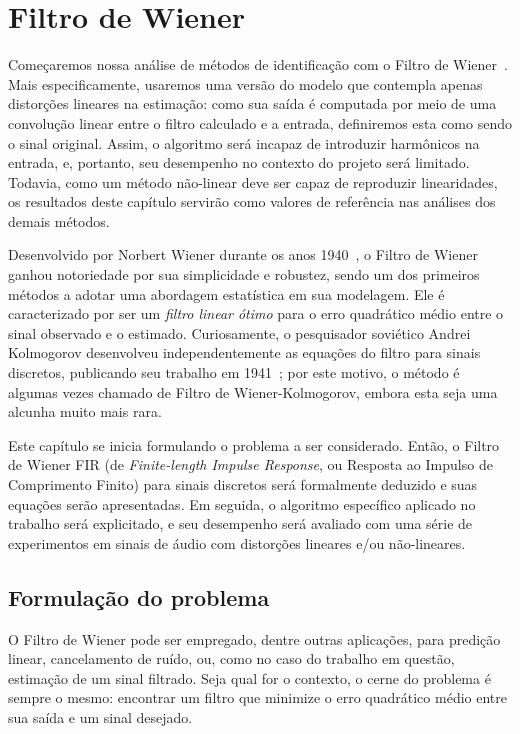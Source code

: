 \chapter{Filtro de Wiener}
\label{chapter:wiener}

Começaremos nossa análise de métodos de identificação com o Filtro de Wiener~\cite{hayes-1996}. Mais especificamente, usaremos uma versão do modelo que contempla apenas distorções lineares na estimação: como sua saída é computada por meio de uma convolução linear entre o filtro calculado e a entrada, definiremos esta como sendo o sinal original. Assim, o algoritmo será incapaz de introduzir harmônicos na entrada, e, portanto, seu desempenho no contexto do projeto será limitado. Todavia, como um método não-linear deve ser capaz de reproduzir linearidades, os resultados deste capítulo servirão como valores de referência nas análises dos demais métodos.

Desenvolvido por Norbert Wiener durante os anos 1940~\cite{wiener-1949}, o Filtro de Wiener ganhou notoriedade por sua simplicidade e robustez, sendo um dos primeiros métodos a adotar uma abordagem estatística em sua modelagem. Ele é caracterizado por ser um \emph{filtro linear ótimo} para o erro quadrático médio entre o sinal observado e o estimado. Curiosamente, o pesquisador soviético Andrei Kolmogorov desenvolveu independentemente as equações do filtro para sinais discretos, publicando seu trabalho em 1941~\cite{kolmogorov-1941}; por este motivo, o método é algumas vezes chamado de Filtro de Wiener-Kolmogorov, embora esta seja uma alcunha muito mais rara.

Este capítulo se inicia formulando o problema a ser considerado. Então, o Filtro de Wiener FIR (de \textit{Finite-length Impulse Response}, ou Resposta ao Impulso de Comprimento Finito) para sinais discretos será formalmente deduzido e suas equações serão apresentadas. Em seguida, o algoritmo específico aplicado no trabalho será explicitado, e seu desempenho será avaliado com uma série de experimentos em sinais de áudio com distorções lineares e/ou não-lineares.

\section{Formulação do problema}
\label{section:wiener:wiener-model}

O Filtro de Wiener pode ser empregado, dentre outras aplicações, para predição linear, cancelamento de ruído, ou, como no caso do trabalho em questão, estimação de um sinal filtrado. Seja qual for o contexto, o cerne do problema é sempre o mesmo: encontrar um filtro que minimize o erro quadrático médio entre sua saída e um sinal desejado.

